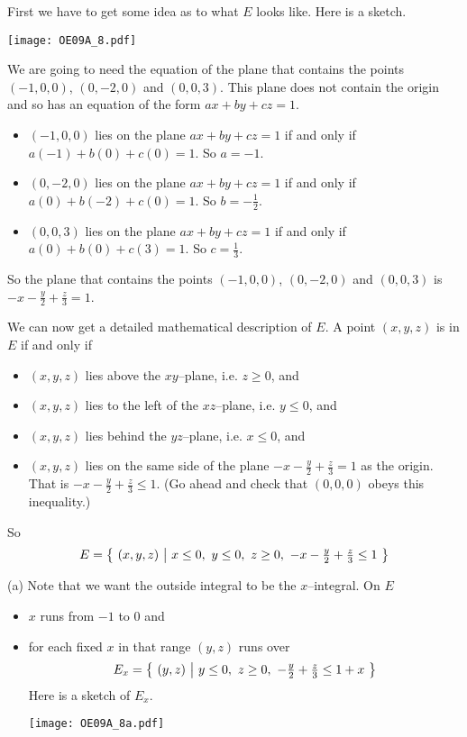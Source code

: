 \begin{solution}
First we have to get some idea as to what $E$ looks like.
Here is a sketch.
\begin{center}
     \texttt{[image: OE09A\_8.pdf]}
\end{center}
We are going to need the equation of the plane that contains the
points $(-1,0,0)$, $(0,-2,0)$ and $(0,0,3)$. This plane does not contain
the origin and so has an equation of the form $ax+by+cz=1$. 
\begin{itemize}
\item
$(-1,0,0)$ lies on the plane $ax+by+cz=1$ if and only if
$a(-1)+b(0)+c(0)=1$. So $a=-1$.
\item
$(0,-2,0)$ lies on the plane $ax+by+cz=1$ if and only if
$a(0)+b(-2)+c(0)=1$. So $b=-\frac{1}{2}$.
\item
$(0,0,3)$ lies on the plane $ax+by+cz=1$ if and only if
$a(0)+b(0)+c(3)=1$. So $c=\frac{1}{3}$.
\end{itemize}
So the plane that contains the points $(-1,0,0)$, $(0,-2,0)$ and $(0,0,3)$
is $-x-\frac{y}{2}+\frac{z}{3}=1$.

We can now get a detailed mathematical description of $E$.
A point $(x,y,z)$ is in $E$ if and only if
\begin{itemize}
\item
$(x,y,z)$ lies above the $xy$--plane, i.e. $z\ge 0$, and
\item
$(x,y,z)$ lies to the left of the $xz$--plane, i.e. $y\le 0$, and
\item
$(x,y,z)$ lies behind the $yz$--plane, i.e. $x\le 0$, and
\item
$(x,y,z)$ lies on the same side of the plane 
$-x-\frac{y}{2}+\frac{z}{3}=1$ as the origin.
That is  $-x-\frac{y}{2}+\frac{z}{3}\le 1$. (Go ahead and check
that $(0,0,0)$ obeys this inequality.)

\end{itemize}
So
\begin{equation*}
E=\Set{(x,y,z)}{x\le 0,\ y\le 0,\ z\ge 0,\ -x-\tfrac{y}{2}+\tfrac{z}{3}\le 1}
\end{equation*}

(a) Note that we want the outside integral to be the $x$--integral.
On $E$
\begin{itemize}
\item 
$x$ runs from $-1$ to $0$ and
\item
for each fixed $x$ in that range $(y,z)$ runs over
\begin{align*}
E_x=\big\{ \ (y,z)\ \big|\ y\le 0,\ z\ge 0,\ -\tfrac{y}{2}+\tfrac{z}{3}\le 1+x\ \big\}
\end{align*}
Here is a sketch of $E_x$.
\begin{center}
     \texttt{[image: OE09A\_8a.pdf]}
\end{center}


\end{itemize}
\end{solution}
